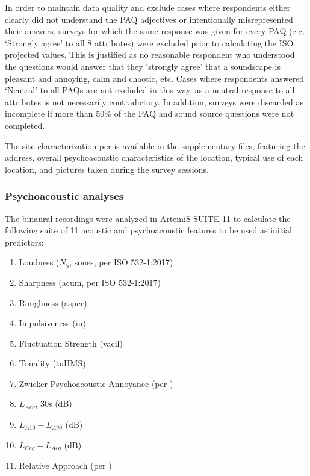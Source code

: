 In order to maintain data quality and exclude cases where respondents either clearly did not understand the PAQ adjectives or intentionally misrepresented their answers, surveys for which the same response was given for every PAQ (e.g. `Strongly agree' to all 8 attributes) were excluded prior to calculating the ISO projected values. This is justified as no reasonable respondent who understood the questions would answer that they `strongly agree' that a soundscape is pleasant and annoying, calm and chaotic, etc. Cases where respondents answered `Neutral' to all PAQs are not excluded in this way, as a neutral response to all attributes is not necessarily contradictory. In addition, surveys were discarded as incomplete if more than 50\% of the PAQ and sound source questions were not completed. 

The site characterization per \citet{international_organisation_for_standardization_isots_2018} is available in the supplementary files, featuring the address, overall psychoacoustic characteristics of the location, typical use of each location, and pictures taken during the survey sessions.

\subsubsection{Psychoacoustic analyses}

The binaural recordings were analyzed in ArtemiS SUITE 11 to calculate the following suite of 11 acoustic and psychoacoustic features to be used as initial predictors:
\begin{enumerate}
    \item Loudness ($N_5$, sones, per ISO 532-1:2017)
    \item Sharpness (acum, per ISO 532-1:2017)
    \item Roughness (asper)
    \item Impulsiveness (iu)
    \item Fluctuation Strength (vacil)
    \item Tonality (tuHMS)
    \item Zwicker Psychoacoustic Annoyance (per \citet{zwicker_psychoacoustics_2007})
    \item $L_{Aeq}$, 30s (dB)
    \item $L_{A10}-L_{A90}$ (dB)
    \item $L_{Ceq}-L_{Aeq}$ (dB)
    \item Relative Approach (per \citet{genuit_objective_1996})

\end{enumerate}

